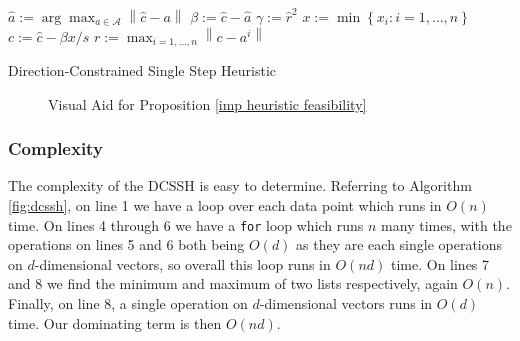\documentclass[11pt,twoside]{report}
\newcommand{\A}{\mathcal{A}} %
\newcommand{\norm}[1]{\left\lVert#1\right\rVert} %
\theoremstyle{definition}
\numberwithin{theorem}{section}
\numberwithin{definition}{section}
\numberwithin{lemma}{section}
\numberwithin{proposition}{section}
\numberwithin{equation}{section}
\numberwithin{figure}{section}
\begin{document}
\begin{algorithm}[H]\label{fig:dcssh}
    \KwIn{Data set $\A$, Ball $B(\hat{c},\hat{r})$, scalar $s\geq1$}
    $\hat{a}:=\arg\max_{a\in\A}\norm{\hat{c}-a}$\;
    $\beta:=\hat{c}-\hat{a}$\;
    $\gamma:=\hat{r}^2$\;
    $x:=\min\left\{x_i: i=1,\ldots,n\right\}$\;
    $c:= \hat{c}-\beta x/s$\;
    $r:=\max_{i=1,\ldots,n}\norm{c-a^i}$\;
    \;
    \caption{Direction-Constrained Single Step Heuristic}
\end{algorithm}
\begin{figure}
    \centering
    \caption{Visual Aid for Proposition \ref{imp heuristic feasibility}}
    \label{vis aid feasibility}
\end{figure}
\subsubsection{Complexity}

The complexity of the DCSSH is easy to determine. Referring to Algorithm \ref{fig:dcssh}, on line 1 we have a loop over each data point which runs in $O(n)$ time. On lines 4 through 6 we have a \texttt{for} loop which runs $n$ many times, with the operations on lines 5 and 6 both being $O(d)$ as they are each single operations on $d$-dimensional vectors, so overall this loop runs in $O(nd)$ time. On lines 7 and 8 we find the minimum and maximum of two lists respectively, again $O(n)$. Finally, on line 8, a single operation on $d$-dimensional vectors runs in $O(d)$ time. Our dominating term is then $O(nd)$.
\end{document}
